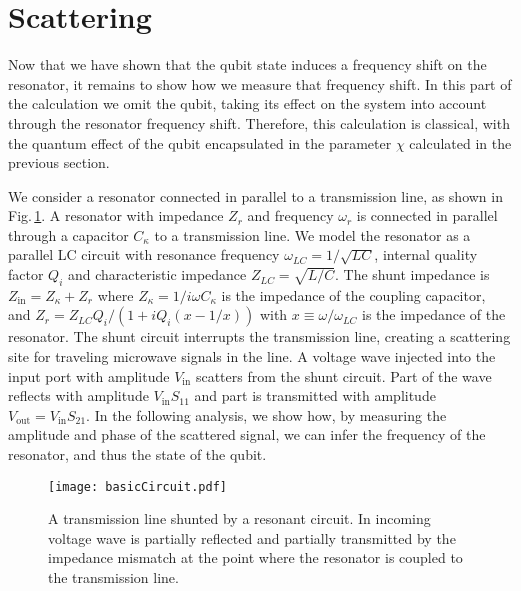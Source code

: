 \section{Scattering}

Now that we have shown that the qubit state induces a frequency shift on the resonator, it remains to show how we measure that frequency shift.
In this part of the calculation we omit the qubit, taking its effect on the system into account through the resonator frequency shift.
Therefore, this calculation is classical, with the quantum effect of the qubit encapsulated in the parameter $\chi$ calculated in the previous section.

We consider a resonator connected in parallel to a transmission line, as shown in Fig.\,\ref{Fig:scatteringDiagram}.
A resonator with impedance $Z_r$ and frequency $\omega_r$ is connected in parallel through a capacitor $C_{\kappa}$ to a transmission line.
We model the resonator as a parallel LC circuit with resonance frequency $\omega_{LC}=1/\sqrt{LC}$, internal quality factor $Q_i$ and characteristic impedance $Z_{LC}=\sqrt{L/C}$.
The shunt impedance is $Z_{\text{in}}=Z_{\kappa} + Z_r$ where $Z_{\kappa} = 1/i\omega C_{\kappa}$ is the impedance of the coupling capacitor, and $Z_r = Z_{LC}Q_i/(1+iQ_i(x-1/x))$ with $x \equiv \omega/\omega_{LC}$ is the impedance of the resonator.
The shunt circuit interrupts the transmission line, creating a scattering site for traveling microwave signals in the line.
A voltage wave injected into the input port with amplitude $V_{\textrm{in}}$ scatters from the shunt circuit.
Part of the wave reflects with amplitude $V_{\textrm{in}}S_{11}$ and part is transmitted with amplitude $V_{\textrm{out}}=V_{\textrm{in}}S_{21}$.
In the following analysis, we show how, by measuring the amplitude and phase of the scattered signal, we can infer the frequency of the resonator, and thus the state of the qubit.

\begin{figure}
\begin{centering}
\texttt{[image: basicCircuit.pdf]} 
\par\end{centering}
\caption{A transmission line shunted by a resonant circuit. In incoming voltage wave is partially reflected and partially transmitted by the impedance mismatch at the point where the resonator is coupled to the transmission line.}
\label{Fig:scatteringDiagram}
\end{figure}

